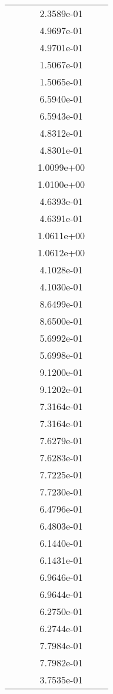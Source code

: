\begin{xltabular}{\textwidth}{r|rS[table-format=1.3e+2]S[table-format=1.4e+2]S[table-format=1.4e+2]S[table-format=-1.5]}
&  &  & 2.3589e-01 & & \\
&  &  & 4.9697e-01 & & \\
&  &  & 4.9701e-01 & & \\
&  &  & 1.5067e-01 & & \\
&  &  & 1.5065e-01 & & \\
&  &  & 6.5940e-01 & & \\
&  &  & 6.5943e-01 & & \\
&  &  & 4.8312e-01 & & \\
&  &  & 4.8301e-01 & & \\
&  &  & 1.0099e+00 & & \\
&  &  & 1.0100e+00 & & \\
&  &  & 4.6393e-01 & & \\
&  &  & 4.6391e-01 & & \\
&  &  & 1.0611e+00 & & \\
&  &  & 1.0612e+00 & & \\
&  &  & 4.1028e-01 & & \\
&  &  & 4.1030e-01 & & \\
&  &  & 8.6499e-01 & & \\
&  &  & 8.6500e-01 & & \\
&  &  & 5.6992e-01 & & \\
&  &  & 5.6998e-01 & & \\
&  &  & 9.1200e-01 & & \\
&  &  & 9.1202e-01 & & \\
&  &  & 7.3164e-01 & & \\
&  &  & 7.3164e-01 & & \\
&  &  & 7.6279e-01 & & \\
&  &  & 7.6283e-01 & & \\
&  &  & 7.7225e-01 & & \\
&  &  & 7.7230e-01 & & \\
&  &  & 6.4796e-01 & & \\
&  &  & 6.4803e-01 & & \\
&  &  & 6.1440e-01 & & \\
&  &  & 6.1431e-01 & & \\
&  &  & 6.9646e-01 & & \\
&  &  & 6.9644e-01 & & \\
&  &  & 6.2750e-01 & & \\
&  &  & 6.2744e-01 & & \\
&  &  & 7.7984e-01 & & \\
&  &  & 7.7982e-01 & & \\
&  &  & 3.7535e-01 & & \\

\end{xltabular}
